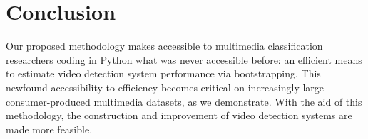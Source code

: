 \section{Conclusion}

Our proposed methodology makes accessible to multimedia classification researchers coding in Python what was never accessible before: an efficient means to estimate video detection system performance via bootstrapping.
This newfound accessibility to efficiency becomes critical on increasingly large consumer-produced multimedia datasets, as we demonstrate. 
With the aid of this methodology, the construction and improvement of video detection systems are made more feasible.




